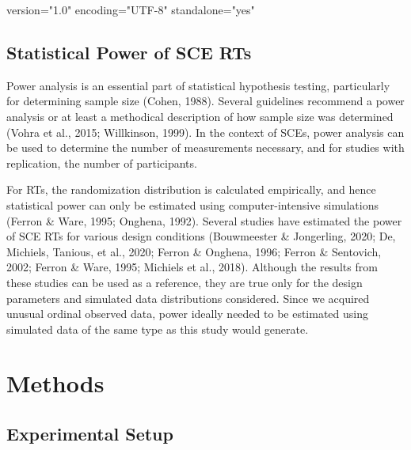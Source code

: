 version="1.0" encoding="UTF-8" standalone="yes" \documentclass{article}
\begin{document}
\subsection{Statistical Power of SCE RTs }

Power analysis is an essential part of statistical hypothesis testing, particularly for determining sample size (Cohen, 1988). Several guidelines recommend a power analysis or at least a methodical description of how sample size was determined (Vohra et al., 2015; Willkinson, 1999). In the context of SCEs, power analysis can be used to determine the number of measurements necessary, and for studies with replication, the number of participants.

For RTs, the randomization distribution is calculated empirically, and hence statistical power can only be estimated using computer-intensive simulations (Ferron \& Ware, 1995; Onghena, 1992). Several studies have estimated the power of SCE RTs for various design conditions (Bouwmeester \& Jongerling, 2020; De, Michiels, Tanious, et al., 2020; Ferron \& Onghena, 1996; Ferron \& Sentovich, 2002; Ferron \& Ware, 1995; Michiels et al., 2018). Although the results from these studies can be used as a reference, they are true only for the design parameters and simulated data distributions considered. Since we acquired unusual ordinal observed data, power ideally needed to be estimated using simulated data of the same type as this study would generate.

\section{Methods}

\subsection{Experimental Setup}
\end{document}
